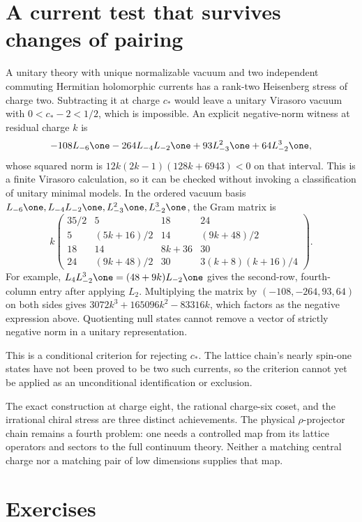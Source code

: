 \section{A current test that survives changes of pairing}

A unitary theory
with unique normalizable vacuum and two independent commuting
Hermitian holomorphic currents has a rank-two Heisenberg stress of
charge two. Subtracting it at charge $c_*$ would leave a unitary
Virasoro vacuum with $0<c_*-2<1/2$, which is impossible. An explicit
negative-norm witness at residual charge $k$ is
\[
 -108L_{-6}\one-264L_{-4}L_{-2}\one
             +93L_{-3}^2\one+64L_{-2}^3\one,
\]
whose squared norm is
$12k(2k-1)(128k+6943)<0$ on that interval.
This is a finite Virasoro calculation, so it can be checked without
invoking a classification of unitary minimal models. In the ordered
vacuum basis
$L_{-6}\one,L_{-4}L_{-2}\one,L_{-3}^2\one,L_{-2}^3\one$,
the Gram matrix is
\[
 k\begin{pmatrix}
 35/2&5&18&24\\
 5&(5k+16)/2&14&(9k+48)/2\\
 18&14&8k+36&30\\
 24&(9k+48)/2&30&3(k+8)(k+16)/4
 \end{pmatrix}.
\]
For example,
$L_4L_{-2}^3\one=(48+9k)L_{-2}\one$ gives the second-row,
fourth-column entry after applying $L_2$.
Multiplying the matrix by $(-108,-264,93,64)$ on both sides
gives $3072k^3+165096k^2-83316k$, which factors as the
negative expression above. Quotienting null states cannot remove
a vector of strictly negative norm in a unitary representation.

This is a conditional criterion for rejecting $c_*$. The lattice
chain's nearly spin-one states have not been proved to be two such
currents, so the criterion cannot yet be applied as an unconditional
identification or exclusion.

The exact construction at charge eight, the rational charge-six coset,
and the irrational chiral stress are three distinct achievements.
The physical $\rho$-projector chain remains a fourth problem: one
needs a controlled map from its lattice operators and sectors to the
full continuum theory. Neither a matching central charge nor a
matching pair of low dimensions supplies that map.

\section{Exercises}

